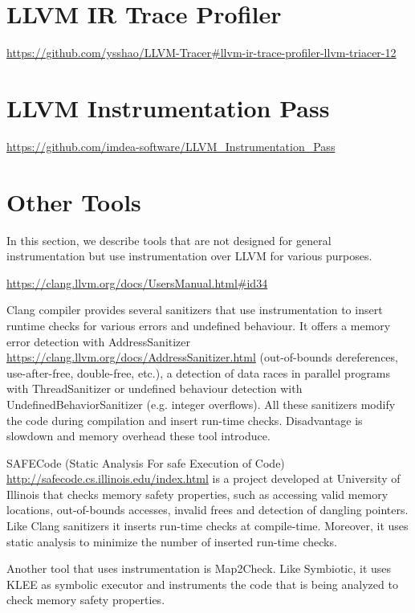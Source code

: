 \section{LLVM IR Trace Profiler}

\url{https://github.com/ysshao/LLVM-Tracer#llvm-ir-trace-profiler-llvm-triacer-12}

\section{LLVM Instrumentation Pass}

\url{https://github.com/imdea-software/LLVM\_Instrumentation\_Pass}

\section{Other Tools}

In this section, we describe tools that are not designed for general
instrumentation but use instrumentation over LLVM for various purposes.

\url{https://clang.llvm.org/docs/UsersManual.html#id34}

Clang compiler provides several sanitizers that use instrumentation to insert
runtime checks for various errors and undefined behaviour. It offers a memory
error detection with AddressSanitizer
\textcolor{red}{\url{https://clang.llvm.org/docs/AddressSanitizer.html}}
(out-of-bounds dereferences, use-after-free, double-free, etc.), a detection of
data races in parallel programs with ThreadSanitizer or undefined behaviour
detection with UndefinedBehaviorSanitizer (e.g. integer overflows). All these
sanitizers modify the code during compilation and insert run-time checks.
Disadvantage is slowdown and memory overhead these tool introduce.

SAFECode (Static Analysis For safe Execution of Code)
\url{http://safecode.cs.illinois.edu/index.html} is a project developed at
University of Illinois that checks memory safety properties, such as accessing
valid memory locations, out-of-bounds accesses, invalid frees and detection of
dangling pointers. Like Clang sanitizers it inserts run-time checks at
compile-time. Moreover, it uses static analysis to minimize the number of
inserted run-time checks.

Another tool that uses instrumentation is Map2Check. Like Symbiotic, it uses
KLEE as symbolic executor and instruments the code that is being analyzed to
check memory safety properties.
